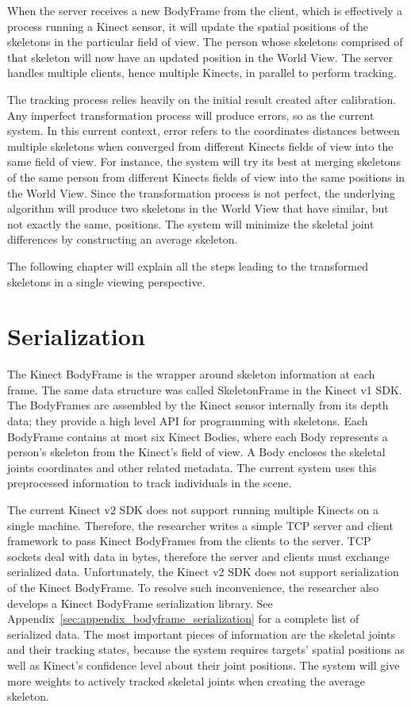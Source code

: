 When the server receives a new BodyFrame from the client, which is effectively a process running a Kinect sensor, it will update the spatial positions of the skeletons in the particular field of view. The person whose skeletons comprised of that skeleton will now have an updated position in the World View. The server handles multiple clients, hence multiple Kinects, in parallel to perform tracking.

The tracking process relies heavily on the initial result created after calibration. Any imperfect transformation process will produce errors, so as the current system. In this current context, error refers to the coordinates distances between multiple skeletons when converged from different Kinects fields of view into the same field of view. For instance, the system will try its best at merging skeletons of the same person from different Kinects fields of view into the same positions in the World View. Since the transformation process is not perfect, the underlying algorithm will produce two skeletons in the World View that have similar, but not exactly the same, positions. The system will minimize the skeletal joint differences by constructing an average skeleton.

The following chapter will explain all the steps leading to the transformed skeletons in a single viewing perspective.

\section{Serialization}
\label{sec:current_approach_serialization}

The Kinect BodyFrame is the wrapper around skeleton information at each frame. The same data structure was called SkeletonFrame in the Kinect v1 SDK. The BodyFrames are assembled by the Kinect sensor internally from its depth data; they provide a high level API for programming with skeletons. Each BodyFrame contains at most six Kinect Bodies, where each Body represents a person's skeleton from the Kinect's field of view. A Body encloses the skeletal joints coordinates and other related metadata. The current system uses this preprocessed information to track individuals in the scene.

The current Kinect v2 SDK does not support running multiple Kinects on a single machine. Therefore, the researcher writes a simple TCP server and client framework to pass Kinect BodyFrames from the clients to the server. TCP sockets deal with data in bytes, therefore the server and clients must exchange serialized data. Unfortunately, the Kinect v2 SDK does not support serialization of the Kinect BodyFrame. To resolve such inconvenience, the researcher also develops a Kinect BodyFrame serialization library. See Appendix~\ref{sec:appendix_bodyframe_serialization} for a complete list of serialized data. The most important pieces of information are the skeletal joints and their tracking states, because the system requires targets' spatial positions as well as Kinect's confidence level about their joint positions. The system will give more weights to actively tracked skeletal joints when creating the average skeleton.

